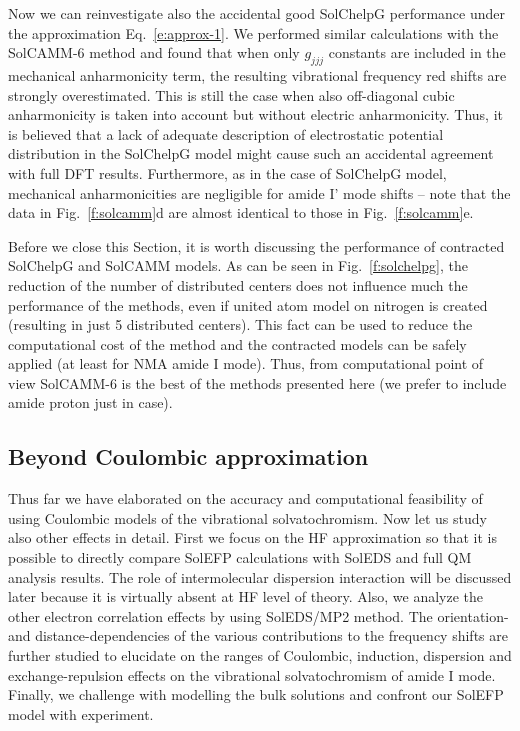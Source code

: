 \documentclass[a4paper,titlepage,twoside,fleqn,12pt]{book}
\begin{document}
\begin{refsection}
Now we can reinvestigate also the accidental good SolChelpG performance under the
approximation Eq.~\eqref{e:approx-1}. We performed similar 
calculations with the SolCAMM-6 method and found that when only $g_{jjj}$
constants are included in the mechanical anharmonicity term, 
the resulting vibrational frequency red shifts are strongly overestimated.
This is still the case when also off\hyp{}diagonal cubic anharmonicity
is taken into account but without electric anharmonicity.
Thus, it is believed that a lack of adequate description
of electrostatic potential distribution in the SolChelpG
model might cause such an accidental agreement with full DFT results. Furthermore,
as in the case of SolChelpG model, mechanical
anharmonicities are negligible for amide I' mode shifts -- note
that the data in Fig.~\ref{f:solcamm}d are almost identical to those in
Fig.~\ref{f:solcamm}e.

Before we close this Section, it is worth discussing 
the performance of contracted SolChelpG and
SolCAMM models. As can be seen in Fig.~\ref{f:solchelpg}, 
the reduction of the number of distributed centers
does not influence much the performance of the methods, even if united atom 
model on nitrogen is created (resulting in just 5 distributed centers). 
This fact can be used to reduce the computational cost of the method
and the contracted models can be safely applied (at least for NMA amide I mode).
Thus, from computational point of view SolCAMM-6 is the best of the methods
presented here (we prefer to include amide proton just in case).

\subsection{Beyond Coulombic approximation}

Thus far we have elaborated on the accuracy and computational
feasibility of using Coulombic models of the vibrational solvatochromism.
Now let us study also other effects in detail.
First we focus on the HF approximation
so that it is possible to directly compare SolEFP calculations
with SolEDS and full QM analysis results. The role of intermolecular dispersion interaction
will be discussed later because it is virtually absent
at HF level of theory. Also, we analyze the other electron correlation
effects by using SolEDS/MP2 method. The orientation\hyp{}
and distance\hyp{}dependencies of the various contributions
to the frequency shifts are further studied to elucidate on
the ranges of Coulombic, induction, dispersion and exchange\hyp{}repulsion
effects on the vibrational solvatochromism of amide I mode.
Finally, we challenge with modelling the bulk solutions
and confront our SolEFP model with experiment.


\end{refsection}
\end{document}
